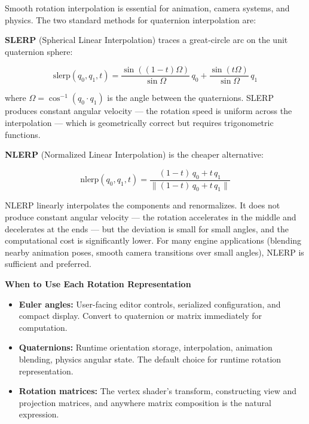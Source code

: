 \documentclass[
  11pt,
  letterpaper,
  DIV=11,
  numbers=noendperiod,
  twoside,
  open=right]{scrreprt}
\providecommand{\tightlist}{%
  \setlength{\itemsep}{0pt}\setlength{\parskip}{0pt}}
\begin{document}
Smooth rotation interpolation is essential for animation, camera
systems, and physics. The two standard methods for quaternion
interpolation are:

\textbf{SLERP} (Spherical Linear Interpolation) traces a great-circle
arc on the unit quaternion sphere:

\[
\text{slerp}(q_0, q_1, t) = \frac{\sin((1-t)\Omega)}{\sin\Omega} \, q_0 + \frac{\sin(t\Omega)}{\sin\Omega} \, q_1
\]

where \(\Omega = \cos^{-1}(q_0 \cdot q_1)\) is the angle between the
quaternions. SLERP produces constant angular velocity --- the rotation
speed is uniform across the interpolation --- which is geometrically
correct but requires trigonometric functions.

\textbf{NLERP} (Normalized Linear Interpolation) is the cheaper
alternative:

\[
\text{nlerp}(q_0, q_1, t) = \frac{(1-t) \, q_0 + t \, q_1}{\|(1-t) \, q_0 + t \, q_1\|}
\]

NLERP linearly interpolates the components and renormalizes. It does not
produce constant angular velocity --- the rotation accelerates in the
middle and decelerates at the ends --- but the deviation is small for
small angles, and the computational cost is significantly lower. For
many engine applications (blending nearby animation poses, smooth camera
transitions over small angles), NLERP is sufficient and preferred.

\begin{tcolorbox}[enhanced jigsaw, arc=.35mm, bottomrule=.15mm, breakable, colback=white, colframe=quarto-callout-note-color-frame, left=2mm, leftrule=.75mm, opacityback=0, rightrule=.15mm, toprule=.15mm]
\begin{minipage}[t]{5.5mm}
\textcolor{quarto-callout-note-color}{\faInfo}
\end{minipage}%
\begin{minipage}[t]{\textwidth - 5.5mm}

\vspace{-3mm}\textbf{When to Use Each Rotation Representation}\vspace{3mm}

\begin{itemize}
\tightlist
\item
  \textbf{Euler angles:} User-facing editor controls, serialized
  configuration, and compact display. Convert to quaternion or matrix
  immediately for computation.
\item
  \textbf{Quaternions:} Runtime orientation storage, interpolation,
  animation blending, physics angular state. The default choice for
  runtime rotation representation.
\item
  \textbf{Rotation matrices:} The vertex shader's transform,
  constructing view and projection matrices, and anywhere matrix
  composition is the natural expression.
\end{itemize}

\end{minipage}%
\end{tcolorbox}
\end{document}
